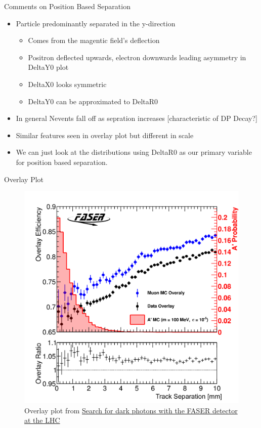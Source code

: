 \begin{frame}{Comments on Position Based Separation}
		\begin{itemize}
			\item Particle predominantly separated in the y-direction
			\begin{itemize}
				\item Comes from the magentic field's deflection
				\item Positron deflected upwards, electron downwards leading asymmetry in DeltaY0 plot
				\item DeltaX0 looks symmetric
				\item DeltaY0 can be approximated to DeltaR0
			\end{itemize}
			\item In general Nevents fall off as sepration increases [characteristic of DP Decay?]
			\item Similar features seen in overlay plot but different in scale
			\item We can just look at the distributions using DeltaR0 as our primary variable for position based separation.
		\end{itemize}
\end{frame}

\begin{frame}{Overlay Plot}
	\begin{figure}
		\includegraphics[width=0.7 \linewidth]{./assets/OverlayTracks.png}
		\caption{Overlay plot from \href{https://cds.cern.ch/record/2864686/plots}{Search for dark photons with the FASER detector at the LHC} }
	\end{figure}
\end{frame}


